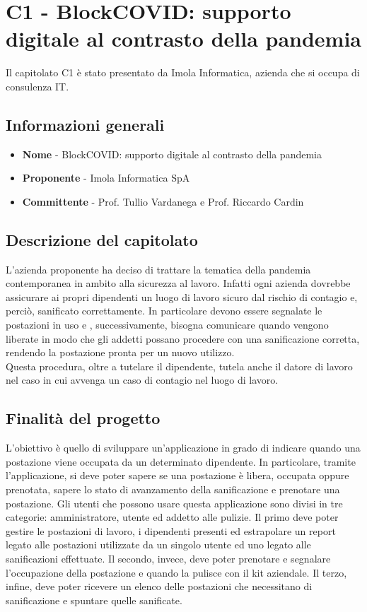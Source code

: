 \chapter{C1 - BlockCOVID: supporto digitale al contrasto della pandemia}
Il capitolato C1 è stato presentato da Imola Informatica, azienda che si occupa di consulenza IT.
\section{Informazioni generali}
\begin{itemize}
	\item \textbf{Nome} - BlockCOVID: supporto digitale al contrasto della pandemia
	\item \textbf{Proponente} - Imola Informatica SpA
	\item \textbf{Committente} - Prof. Tullio Vardanega e Prof. Riccardo Cardin
\end{itemize}
\section{Descrizione del capitolato}
L'azienda proponente ha deciso di trattare la tematica della pandemia contemporanea in ambito alla sicurezza al lavoro. Infatti ogni azienda dovrebbe assicurare ai propri dipendenti un luogo di lavoro sicuro dal rischio di contagio e, perciò, sanificato correttamente. In particolare devono essere segnalate le postazioni in uso e , successivamente, bisogna comunicare quando vengono liberate in modo che gli addetti possano procedere con una sanificazione corretta, rendendo la postazione pronta per un nuovo utilizzo.\\
Questa procedura, oltre a tutelare il dipendente, tutela anche il datore di lavoro nel caso in cui avvenga un caso di contagio nel luogo di lavoro.
\section{Finalità del progetto}
L'obiettivo è quello di sviluppare un'applicazione in grado di indicare quando una postazione viene occupata da un determinato dipendente. In particolare, tramite l'applicazione, si deve poter sapere se una postazione è libera, occupata oppure prenotata, sapere lo stato di avanzamento della sanificazione e prenotare una postazione. Gli utenti che possono usare questa applicazione sono divisi in tre categorie: amministratore, utente ed addetto alle pulizie. Il primo deve poter gestire le postazioni di lavoro, i dipendenti presenti ed estrapolare un report legato alle postazioni utilizzate da un singolo utente ed uno legato alle sanificazioni effettuate. Il secondo, invece, deve poter prenotare e segnalare l'occupazione della postazione e quando la pulisce con il kit aziendale. Il terzo, infine, deve poter ricevere un elenco delle postazioni che necessitano di sanificazione e spuntare quelle sanificate.
